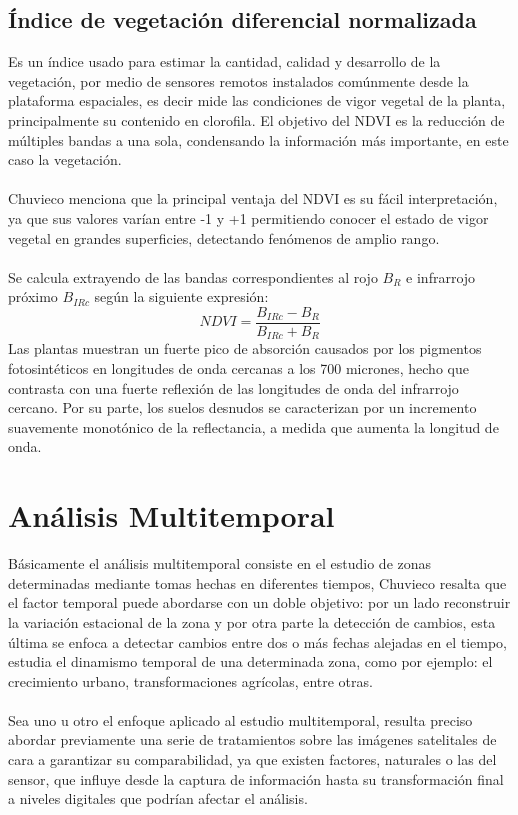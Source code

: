 \subsection{\'Indice de vegetaci\'on diferencial normalizada}
Es un \'indice usado para estimar la cantidad, calidad y desarrollo de la vegetaci\'on, por medio de sensores remotos instalados com\'unmente desde la plataforma espaciales, es decir mide las condiciones de vigor vegetal de la planta, principalmente su contenido en clorofila\cite{salinero2002teledeteccion}. El objetivo del NDVI es la reducci\'on de m\'ultiples bandas a una sola, condensando la informaci\'on m\'as importante, en este caso la vegetaci\'on.\\~\\
Chuvieco\cite{salinero2002teledeteccion} menciona que la principal ventaja del NDVI es su f\'acil interpretaci\'on, ya que sus
valores var\'ian entre -1 y +1 permitiendo conocer el estado de vigor vegetal en grandes superficies, detectando fen\'omenos de amplio rango.\\~\\
Se calcula extrayendo de las bandas correspondientes al rojo $B_{R}$ e infrarrojo pr\'oximo $B_{IRc}$ seg\'un la siguiente expresi\'on:
	\begin{equation}
	NDVI=\dfrac{B_{IRc}-B_{R}}{B_{IRc}+B_{R}}
	\end{equation}
Las plantas muestran un fuerte pico de absorci\'on causados por los pigmentos fotosint\'eticos en longitudes de onda cercanas a los 700 micrones, hecho que contrasta con una fuerte reflexi\'on de las longitudes de onda del infrarrojo cercano. Por su parte, los suelos desnudos se caracterizan por un incremento suavemente monot\'onico de la reflectancia, a medida que aumenta la longitud de onda.

\section{An\'alisis Multitemporal}
B\'asicamente el an\'alisis multitemporal consiste en el estudio de zonas determinadas mediante tomas hechas en diferentes tiempos, Chuvieco \cite{salinero2002teledeteccion} resalta que el factor temporal puede abordarse con un doble objetivo: por un lado reconstruir la variaci\'on estacional de la zona y por otra parte la detecci\'on de cambios, esta \'ultima se enfoca a detectar cambios entre dos o m\'as
fechas alejadas en el tiempo, estudia el dinamismo temporal de una determinada zona, como por ejemplo: el crecimiento urbano, transformaciones agrícolas, entre otras.\\~\\
Sea uno u otro el enfoque aplicado al estudio multitemporal, resulta preciso abordar previamente una serie de tratamientos sobre las im\'agenes satelitales de cara a garantizar su comparabilidad, ya que existen factores, naturales o las del sensor, que influye desde la captura de informaci\'on hasta su transformaci\'on final a niveles digitales que podr\'ian afectar el an\'alisis.



